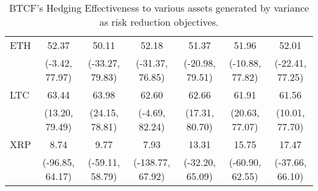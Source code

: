 \begin{table}[p]
{\begin{tabular}{lcccccc}
ETH     &            52.37 &            50.11 &             52.18 &            51.37 &            51.96 &            52.01 \\
        &   (-3.42, 77.97) &  (-33.27, 79.83) &   (-31.37, 76.85) &  (-20.98, 79.51) &  (-10.88, 77.82) &  (-22.41, 77.25) \\
LTC     &            63.44 &            63.98 &             62.60 &            62.66 &            61.91 &            61.56 \\
        &   (13.20, 79.49) &   (24.15, 78.81) &    (-4.69, 82.24) &   (17.31, 80.70) &   (20.63, 77.07) &   (10.01, 77.70) \\
XRP     &             8.74 &             9.77 &              7.93 &            13.31 &            15.75 &            17.47 \\
        &  (-96.85, 64.17) &  (-59.11, 58.79) &  (-138.77, 67.92) &  (-32.20, 65.09) &  (-60.90, 62.55) &  (-37.66, 66.10) \\
\bottomrule
\end{tabular}}
\caption{BTCF's Hedging Effectiveness to various assets generated by variance as risk reduction objectives.}
\label{tab:varHE}

\end{table}

